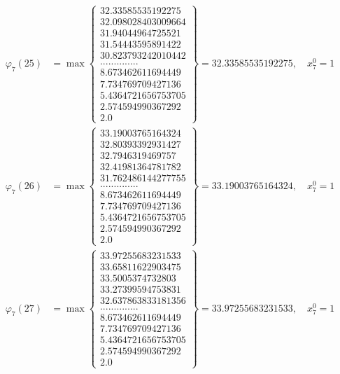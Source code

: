 \documentclass{article}
\begin{document}
\begin{align*}
  
  
  
\varphi_{7}(25) &= \max \left\{ \begin{array}{c}
32.33585535192275 \\
 32.098028403009664 \\
 31.94044964725521 \\
 31.54443595891422 \\
 30.823793242010442 \\
 .............. \\
 8.673462611694449 \\
 7.734769709427136 \\
 5.4364721656753705 \\
 2.574594990367292 \\
 2.0
\end{array} \right\} = 32.33585535192275, \quad x_{7}^0 = 1\\
  
  
  
  
\varphi_{7}(26) &= \max \left\{ \begin{array}{c}
33.19003765164324 \\
 32.80393392931427 \\
 32.7946319469757 \\
 32.41981364781782 \\
 31.762486144277755 \\
 .............. \\
 8.673462611694449 \\
 7.734769709427136 \\
 5.4364721656753705 \\
 2.574594990367292 \\
 2.0
\end{array} \right\} = 33.19003765164324, \quad x_{7}^0 = 1\\
  
  
  
  
\varphi_{7}(27) &= \max \left\{ \begin{array}{c}
33.97255683231533 \\
 33.65811622903475 \\
 33.5005374732803 \\
 33.27399594753831 \\
 32.637863833181356 \\
 .............. \\
 8.673462611694449 \\
 7.734769709427136 \\
 5.4364721656753705 \\
 2.574594990367292 \\
 2.0
\end{array} \right\} = 33.97255683231533, \quad x_{7}^0 = 1\\
  

\end{align*}
\end{document}
